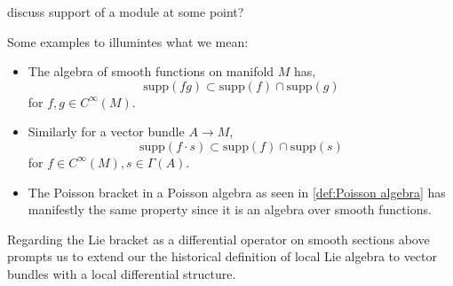 \begin{tcolorbox}
    discuss support of a module at some point?
\end{tcolorbox}
\label{def:locality}
% 
Some examples to illumintes what we mean:
\begin{itemize}
    \item The algebra of smooth functions on manifold $M$ has,
    \begin{equation*}
        \mathrm{supp}(fg) \subset \mathrm{supp}(f) \cap \mathrm{supp}(g)
    \end{equation*}
    for $f,g \in C^\infty(M)$.
    \item Similarly for a vector bundle $A \rightarrow M$,
    \begin{equation*}
        \mathrm{supp}(f \cdot s  ) \subset \mathrm{supp}(f) \cap \mathrm{supp}(s)
    \end{equation*}
    for $f \in C^\infty(M), s \in \Gamma(A)$.
    \item The Poisson bracket in a Poisson algebra as seen in \cref{def:Poisson algebra} has manifestly the same property since it is an algebra over smooth functions.
\end{itemize}
% 
\label{def:local lie algebra-historical}
% 
Regarding the Lie bracket as a differential operator on smooth sections above prompts us to extend our the historical definition of local Lie algebra to vector bundles with a local differential structure.
% 
\label{def:local lie algebra-differential}
